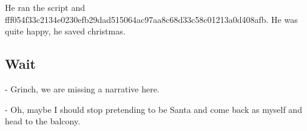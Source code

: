 He ran the script and fff054f33c2134e0230efb29dad515064ac97aa8c68d33c58c01213a0d408afb.
He was quite happy, he saved christmas.
\subsection{Wait}
- Grinch, we are missing a narrative here.

- Oh, maybe I should stop pretending to be Santa and come back as myself and head to the balcony.
